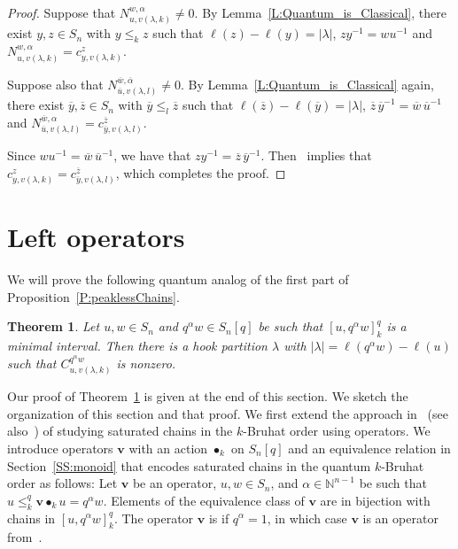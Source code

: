 \documentclass[11pt]{article}
\newtheorem{theorem}[theo]{Theorem}
\theoremstyle{definition}
\numberwithin{equation}{section}
\newcommand{\NN}{{\mathbb N}}
\newcommand{\qv}{{\mathbf v}}
\DeclareMathOperator{\kactionop}{{\scriptstyle \bullet}}
\newcommand{\kaction}[1][k]{\kactionop_{#1}}
\newcommand{\defcolor}[1]{{\color{RoyalBlue}#1}}
\newcommand{\demph}[1]{\defcolor{{\sl #1}}}
\begin{document}
\begin{proof}
  Suppose that $N^{w,\alpha}_{u,v(\lambda,k)}\neq 0$.
  By Lemma~\ref{L:Quantum_is_Classical}, there exist $y,z\in S_n$ with $y\leq_k z$ such that $\ell(z)-\ell(y)=|\lambda|$,
  $zy^{-1}=wu^{-1}$  and    $N^{w,\alpha}_{u,v(\lambda,k)}=c^{z}_{y,v(\lambda,k)}$.

  Suppose also that $N^{\overline{w},\overline{\alpha}}_{\overline{u},v(\lambda,l)}\neq 0$.
  By Lemma~\ref{L:Quantum_is_Classical} again, there exist  $\overline{y},\overline{z}\in S_n$ with
  $\overline{y}\leq_l \overline{z}$ such that $\ell(\overline{z})-\ell(\overline{y})=|\lambda|$,
  $\overline{z}\,\overline{y}^{-1}=\overline{w}\,\overline{u}^{-1}$ and   
  $N^{\overline{w},\alpha}_{\overline{u},v(\lambda,l)}=c^{\overline{z}}_{\overline{y},v(\lambda,l)}$.

  Since $w u^{-1}= \overline{w}\,\overline{u}^{-1}$, we have that
  $zy^{-1}=\overline{z}\,\overline{y}^{-1}$.
  Then~\cite[Thm.\ E]{BS-Bruhat} implies that $c^{z}_{y,v(\lambda,k)}=c^{\overline{z}}_{\overline{y},v(\lambda,l)}$,
  which completes the proof.
\end{proof}

\section{Left operators}
\label{left-operators}

We will prove the following quantum analog of the first part of Proposition~\ref{P:peaklessChains}.

\begin{theorem}
    \label{Th:nonZero}
    Let $u,w\in S_n$ and $q^\alpha w\in S_n[q]$ be such that $[u,q^\alpha w]^q_k$ is a minimal interval.
    Then there is a hook partition $\lambda$ with $|\lambda|=\ell(q^\alpha w)-\ell(u)$ such that
    $C^{q^\alpha w}_{u,v(\lambda,k)}$ is nonzero.
\end{theorem}

Our proof of Theorem~\ref{Th:nonZero} is given at the end of this section.
We sketch the organization of this section and that proof.
We first extend the approach in~\cite{BS-Monoid} (see also~\cite{Benedetti_Bergeron}) of studying saturated chains in the
$k$-Bruhat order using operators.
We introduce operators $\qv$ with an action $\kaction$ on $S_{n}[q]$ and an equivalence relation in Section~\ref{SS:monoid} that encodes
saturated chains in the quantum $k$-Bruhat order as follows:
Let $\qv$ be an operator, $u,w\in S_n$, and $\alpha\in\NN^{n-1}$ be such that $u\leq^q_k \qv\kaction u = q^\alpha w$.
Elements of the equivalence class of $\qv$ are in bijection with chains in $[u,q^\alpha w]^q_k$.
The operator $\qv$ is \demph{classical} if $q^\alpha=1$, in which case $\qv$ is an operator from~\cite{BS-Monoid}.
\end{document}
